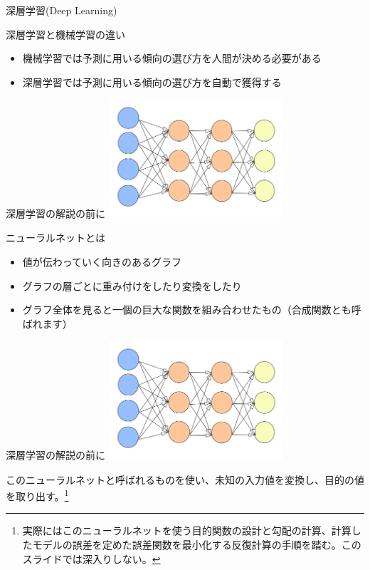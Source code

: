 \documentclass[12pt, unicode]{beamer}
\begin{document}
\begin{frame}{深層学習(Deep Learning)}
\begin{block}{深層学習と機械学習の違い}
\begin{itemize}
\item<1-> 機械学習では予測に用いる傾向の選び方を人間が決める必要がある
\item<2-> 深層学習では予測に用いる傾向の選び方を自動で獲得する
\end{itemize}
\end{block}
\end{frame}

\begin{frame}{深層学習の解説の前に}
\includegraphics[clip,width=6.5cm]{image/neural_net.png}
\begin{block}{ニューラルネットとは}
\begin{itemize}
\item<1-> 値が伝わっていく向きのあるグラフ
\item<2-> グラフの層ごとに重み付けをしたり変換をしたり
\item<3-> グラフ全体を見ると一個の巨大な関数を組み合わせたもの（合成関数とも呼ばれます）
\end{itemize}
\end{block}
\end{frame}

\begin{frame}{深層学習の解説の前に}
\includegraphics[clip,width=6.5cm]{image/neural_net.png}
\begin{block}{}
このニューラルネットと呼ばれるものを使い、未知の入力値を変換し、目的の値を取り出す。\footnote[frame]{実際にはこのニューラルネットを使う目的関数の設計と勾配の計算、計算したモデルの誤差を定めた誤差関数を最小化する反復計算の手順を踏む。このスライドでは深入りしない。}
\end{block}
\end{frame}
\end{document}
